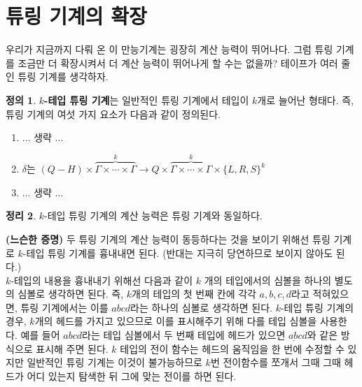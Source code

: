 \documentclass[b5paper, 11pt]{book}
\theoremstyle{definition}
\newtheorem{defn}{정의}[chapter]
\newtheorem{thm}[defn]{정리}
\newenvironment{pf*}{\pushQED{\qed}\pf}
{\popQED\endpf}
\begin{document}
\section{튜링 기계의 확장}
우리가 지금까지 다뤄 온 이 만능기계는 굉장히 계산 능력이 뛰어나다. 그럼 튜링 기계를 조금만 더 확장시켜서 더 계산 능력이 뛰어나게 할 수는 없을까? 테이프가 여러 줄인 튜링 기계를 생각하자.
\begin{defn}
\textbf{$k$-테입 튜링 기계}는 일반적인 튜링 기계에서 테입이 $k$개로 늘어난 형태다. 즉, 튜링 기계의 여섯 가지 요소가 다음과 같이 정의된다.
\begin{enumerate}
    \item $\ldots$ 생략 $\ldots$
    \item $\delta$는 $(Q-H) \times \overbrace{\Gamma \times \cdots \times \Gamma}^k \rightarrow Q \times \overbrace{\Gamma \times \cdots \times \Gamma}^k \times \{L, R, S\}^{k} $ 
    \item $\ldots$ 생략 $\ldots$
\end{enumerate}
\end{defn}
\begin{thm}
    $k$-테입 튜링 기계의 계산 능력은 튜링 기계와 동일하다. 
\end{thm}
\begin{pf*}
    \textbf{(느슨한 증명)}
    두 튜링 기계의 계산 능력이 동등하다는 것을 보이기 위해선 튜링 기계로 $k$-테입 튜링 기계를 흉내내면 된다. (반대는 지극히 당연하므로 보이지 않아도 된다.) \\ 
    $k$-테입의 내용을 흉내내기 위해선 다음과 같이 $k$ 개의 테입에서의 심볼을 하나의 별도의 심볼로 생각하면 된다. 즉, $k$개의 테입의 첫 번째 칸에 각각 $a,b,c,d$라고 적혀있으면, 튜링 기계에서는 이를 $abcd$라는 하나의 심볼로 생각하면 된다. $k$-테입 튜링 기계의 경우, $k$개의 헤드를 가지고 있으므로 이를 표시해주기 위해 다를 테입 심볼을 사용한다. 예를 들어 $abcd$라는 테입 심볼에서 두 번째 테입에 헤드가 있으면 $a\underbar{b}cd$와 같은 방식으로 표시해 주면 된다. $k$ 테입의 전이 함수는 헤드의 움직임을 한 번에 수정할 수 있지만  일반적인 튜링 기계는 이것이 불가능하므로 $k$번 전이함수를 쪼개서 그때 그때 헤드가 어디 있는지 탐색한 뒤 그에 맞는 전이를 하면 된다. 
\end{pf*}
\end{document}
